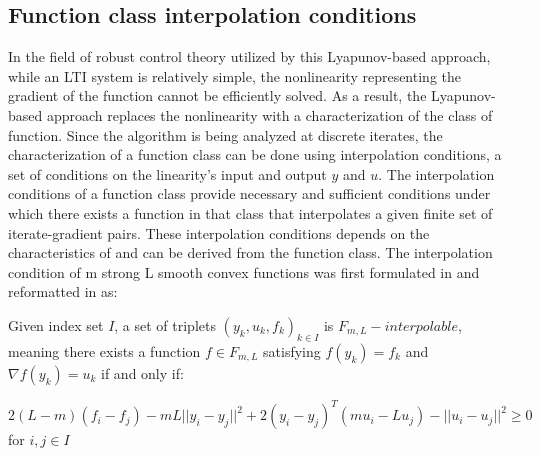 \subsection*{Function class interpolation conditions}

In the field of robust control theory utilized by this Lyapunov-based approach, while an LTI system is relatively simple, the nonlinearity representing the gradient of the function cannot be efficiently solved. As a result, the Lyapunov-based approach replaces the nonlinearity with a characterization of the class of function. Since the algorithm is being analyzed at discrete iterates, the characterization of a function class can be done using interpolation conditions, a set of conditions on the linearity's input and output $y$ and $u$. The interpolation conditions of a function class provide necessary and sufficient conditions under which there exists a function in that class that interpolates a given finite set of iterate-gradient pairs. These interpolation conditions depends on the characteristics of and can be derived from the function class. The interpolation condition of m strong L smooth convex functions was first formulated in \cite{taylor2016} and reformatted in \cite{tutorial} as:

\begin{theorem}
	\label{thm:interpolation_condition}
	Given index set \(I\), a set of triplets \({(y_k, u_k, f_k)}_{k \in I}\) is \(F_{m,L}-interpolable\), meaning there exists a function \(f \in F_{m,L}\) satisfying \(f(y_k) = f_k\) and \(\nabla f(y_k) = u_k\) if and only if:

	\(2(L-m)(f_i - f_j) - mL||y_i - y_j||^2 + 2(y_i - y_j)^{T}(mu_i - Lu_j) - ||u_i - u_j||^2 \geq 0\) for \(i ,j \in I\)

\end{theorem}

